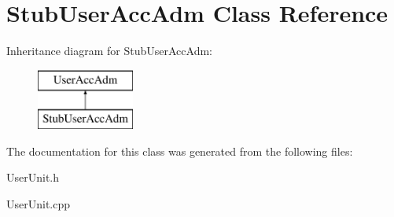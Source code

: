 \hypertarget{classStubUserAccAdm}{\section{Stub\-User\-Acc\-Adm Class Reference}
\label{d3/d88/classStubUserAccAdm}
}
Inheritance diagram for Stub\-User\-Acc\-Adm\-:\begin{figure}[H]
\begin{center}
\leavevmode
\includegraphics[height=2.000000cm]{d3/d88/classStubUserAccAdm}
\end{center}
\end{figure}


The documentation for this class was generated from the following files\-:\begin{DoxyCompactItemize}
\item 
User\-Unit.\-h\item 
User\-Unit.\-cpp\end{DoxyCompactItemize}
